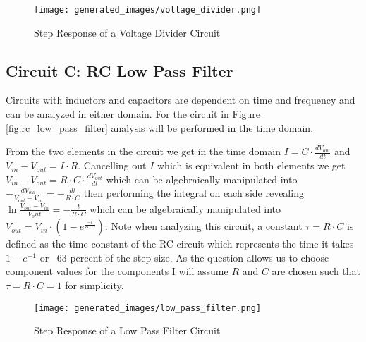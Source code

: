 \documentclass[main.tex]{subfiles}
\begin{document}
\begin{figure}[H]
    \centering
    \texttt{[image: generated\_images/voltage\_divider.png]}
    \caption{Step Response of a Voltage Divider Circuit}
    \label{fig:step-response-voltage-divider}
\end{figure}

\subsection{Circuit C: RC Low Pass Filter}
Circuits with inductors and capacitors are dependent on time and frequency and can be analyzed in either domain. For the circuit in Figure \ref{fig:rc_low_pass_filter} analysis will be performed in the time domain. 

From the two elements in the circuit we get in the time domain $I = C \cdot \frac{dV_{out}}{dt}$ and $V_{in} - V_{out} = I \cdot R$. Cancelling out $I$ which is equivalent in both elements we get $V_{in} - V_{out} = R \cdot C \cdot \frac{dV_{out}}{dt}$ which can be algebraically manipulated into $-\frac{dV_{out}}{V_{out}-V_{in}} = -\frac{dt}{R \cdot C}$ then performing the integral on each side revealing $\ln{\frac{V_{out}-V_{in}}{V_out}}=-\frac{t}{R \cdot C}$ which can be algebraically manipulated into $V_{out}=V_{in} \cdot (1-e^{\frac{-t}{R \cdot C}})$. Note when analyzing this circuit, a constant $\tau = R \cdot C$ is defined as the time constant of the RC circuit which represents the time it takes $1-e^{-1}$ or ~63 percent of the step size. As the question allows us to choose component values for the components I will assume $R$ and $C$ are chosen such that $\tau = R \cdot C = 1$ for simplicity.

\begin{figure}[H]
    \centering
    \texttt{[image: generated\_images/low\_pass\_filter.png]}
    \caption{Step Response of a Low Pass Filter Circuit}
    \label{fig:step-response-low-pass-filter}
\end{figure}
\end{document}
